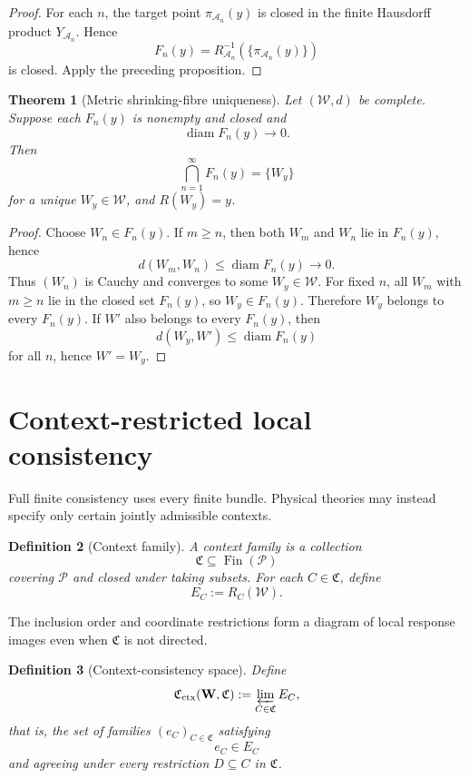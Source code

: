 \documentclass[11pt]{article}
\newtheorem{definition}{Definition}[section]
\newtheorem{theorem}[definition]{Theorem}
\newcommand{\W}{\mathcal W}
\newcommand{\Pcal}{\mathcal P}
\newcommand{\Acal}{\mathcal A}
\newcommand{\Fin}{\operatorname{Fin}}
\begin{document}
\begin{proof}
For each $n$, the target point $\pi_{\Acal_n}(y)$ is closed in the finite
Hausdorff product $Y_{\Acal_n}$. Hence
\[
F_n(y)=R_{\Acal_n}^{-1}\!\left(\{\pi_{\Acal_n}(y)\}\right)
\]
is closed. Apply the preceding proposition.
\end{proof}

\begin{theorem}[Metric shrinking-fibre uniqueness]\label{thm:shrinking}
Let $(\W,d)$ be complete. Suppose each $F_n(y)$ is nonempty and closed and
\[
\operatorname{diam}F_n(y)\longrightarrow0.
\]
Then
\[
\bigcap_{n=1}^{\infty}F_n(y)
=
\{W_y\}
\]
for a unique $W_y\in\W$, and $R(W_y)=y$.
\end{theorem}

\begin{proof}
Choose $W_n\in F_n(y)$. If $m\ge n$, then both $W_m$ and $W_n$ lie in
$F_n(y)$, hence
\[
d(W_m,W_n)\le\operatorname{diam}F_n(y)\to0.
\]
Thus $(W_n)$ is Cauchy and converges to some $W_y\in\W$. For fixed $n$, all
$W_m$ with $m\ge n$ lie in the closed set $F_n(y)$, so $W_y\in F_n(y)$.
Therefore $W_y$ belongs to every $F_n(y)$. If $W'$ also belongs to every
$F_n(y)$, then
\[
d(W_y,W')\le\operatorname{diam}F_n(y)
\]
for all $n$, hence $W'=W_y$.
\end{proof}

\section{Context-restricted local consistency}

Full finite consistency uses every finite bundle. Physical theories may instead
specify only certain jointly admissible contexts.

\begin{definition}[Context family]
A \emph{context family} is a collection
\[
\mathfrak C\subseteq\Fin(\Pcal)
\]
covering $\Pcal$ and closed under taking subsets. For each
$C\in\mathfrak C$, define
\[
E_C:=R_C(\W).
\]
\end{definition}

The inclusion order and coordinate restrictions form a diagram of local
response images even when $\mathfrak C$ is not directed.

\begin{definition}[Context-consistency space]
Define
\[
\mathfrak C_{\mathrm{ctx}}(\mathbf W,\mathfrak C)
:=
\varprojlim_{C\in\mathfrak C}E_C,
\]
that is, the set of families $(e_C)_{C\in\mathfrak C}$ satisfying
\[
e_C\in E_C
\]
and agreeing under every restriction $D\subseteq C$ in $\mathfrak C$.
\end{definition}
\end{document}

